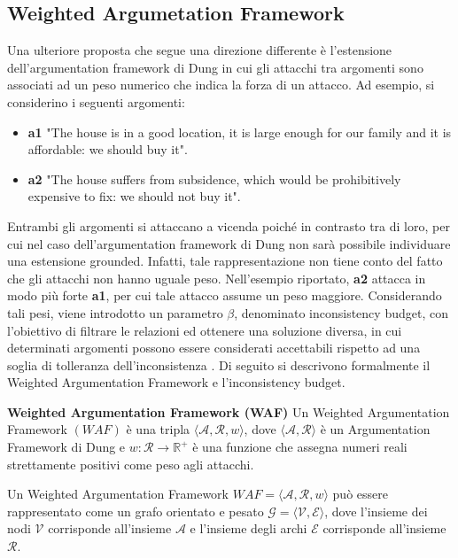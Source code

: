 \subsection{Weighted Argumetation Framework}
Una ulteriore proposta che segue una direzione differente è l'estensione dell'argumentation framework di Dung in cui gli attacchi tra argomenti sono associati ad un peso numerico che indica la forza di un attacco. Ad esempio, si considerino i seguenti argomenti:

\begin{itemize}
    \item \textbf{a1} "The house is in a good location, it is large enough for our family and it is affordable: we should buy it".
    \item \textbf{a2} "The house suffers from subsidence, which would be prohibitively expensive to fix: we should not buy it".
\end{itemize}

Entrambi gli argomenti si attaccano a vicenda poiché in contrasto tra di loro, per cui nel caso dell'argumentation framework di Dung non sarà possibile individuare una estensione grounded. Infatti, tale rappresentazione non tiene conto del fatto che gli attacchi non hanno uguale peso. Nell'esempio riportato, \textbf{a2} attacca in modo più forte \textbf{a1}, per cui tale attacco assume un peso maggiore. Considerando tali pesi, viene introdotto un parametro $\beta$, denominato inconsistency budget, con l'obiettivo di filtrare le relazioni ed ottenere una soluzione diversa, in cui determinati argomenti possono essere considerati accettabili rispetto ad una soglia di tolleranza dell'inconsistenza \cite{dunne2011weighted}. Di seguito si descrivono formalmente il Weighted Argumentation Framework e l'inconsistency budget.


\begin{defn} \textbf{Weighted Argumentation Framework (WAF)}
Un Weighted Argumentation Framework $(WAF)$ è una tripla $⟨\mathcal{A}, \mathcal{R}, w⟩$, dove $⟨\mathcal{A}, \mathcal{R}⟩$ è un Argumentation Framework di Dung e $w: \mathcal{R} \rightarrow \mathbb{R}^{+}$ è una funzione che assegna numeri reali strettamente positivi come peso agli attacchi.
\end{defn}

Un Weighted Argumentation Framework $WAF = ⟨\mathcal{A}, \mathcal{R}, w⟩$ può essere rappresentato come un grafo orientato e pesato $\mathcal{G} = ⟨\mathcal{V}, \mathcal{E}⟩$, dove l'insieme dei nodi $\mathcal{V}$ corrisponde all'insieme $\mathcal{A}$ e l'insieme degli archi $\mathcal{E}$ corrisponde all'insieme $\mathcal{R}$.

